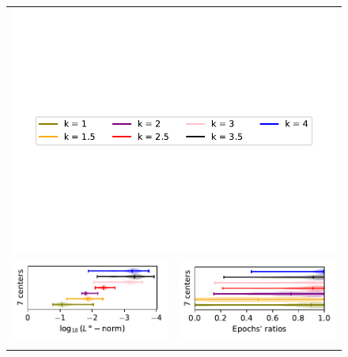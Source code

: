 \documentclass[12pt]{report} %
\begin{document}
\begin{figure}[H]
  \begin{tabular}{rl}
    \multicolumn{2}{c}{{\includegraphics[width=.7\textwidth, trim={0.5cm 4cm .5cm 3.8cm},clip=true]
          {imagenes/experiments/1d/statistical_1d_full/runge_function/runge_function_legend.pdf}}} \\ 
    {\includegraphics[width=.5\textwidth, trim={0 1.25cm 0 0},clip=true]
    {imagenes/experiments/1d/statistical_1d_full/runge_function/linf_runge_function_C7_gaussian_kernel.pdf}}  & 
    {\includegraphics[width=.44\textwidth, trim={.7cm 1.15cm 0 0},clip=true]
    {imagenes/experiments/1d/statistical_1d_full/runge_function/epochs_runge_function_C7_gaussian_kernel.pdf}}                                                                                      \\
    {\includegraphics[width=.5\textwidth, trim={0 1.25cm 0 0},clip=true]
}
\end{tabular}
\end{figure}
\end{document}
